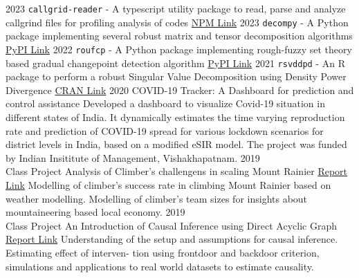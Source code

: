 \documentclass[9pt]{developercv} %
\begin{document}
\begin{entrylist}
    \vspace{-10pt}
    \entry
    {2023}
    {\texttt{callgrid-reader} - A typescript utility package to read, parse and analyze callgrind files for profiling analysis of codes}
    {\href{https://www.npmjs.com/package/callgrind-reader}{NPM Link}}
    {}
    \vspace{-10pt}
    \entry
    {2023}
    {\texttt{decompy} - A Python package implementing several robust matrix and tensor decomposition algorithms}
    {\href{https://pypi.org/project/decompy/}{PyPI Link}}
    {}
    \vspace{-10pt}
    \entry
    {2022}
    {\texttt{roufcp} - A Python package implementing rough-fuzzy set theory based gradual changepoint detection algorithm}
    {\href{https://pypi.org/project/roufcp/}{PyPI Link}}
    {}
    \vspace{-10pt}
    \entry
    {2021}
    {\texttt{rsvddpd} - An R package to perform a robust Singular Value Decomposition using Density Power Divergence}
    {\href{https://cran.r-project.org/web/packages/rsvddpd/index.html}{CRAN Link}}
    {}
    \entry
    {2020}
    {COVID-19 Tracker: A Dashboard for prediction and control assistance}
    {}
    {Developed a dashboard to visualize Covid-19 situation in different states of India. It dynamically estimates the time varying reproduction rate and prediction of COVID-19 spread for various lockdown scenarios for district levels in India, based on a modified eSIR model. The project was funded by Indian Insititute of Management, Vishakhapatnam.}
    \entry
    {2019\\Class Project}
    {Analysis of Climber's challengens in scaling Mount Rainier}
    {\href{https://github.com/subroy13/mount-rainier-case-study}{Report Link} }
    {Modelling of climber's success rate in climbing Mount Rainier based on weather modelling. Modelling of climber's team sizes for insights about mountaineering based local economy.}
    \entry
    {2019\\Class Project}
    {An Introduction of Causal Inference using Direct Acyclic Graph}
    {\href{https://www.statwizard.in/aboutme/causal-dag/final-report.pdf}{Report Link} }
    {Understanding of the setup and assumptions for causal inference. Estimating effect of interven-
        tion using frontdoor and backdoor criterion, simulations and applications to real world datasets to estimate
        causality.}
\end{entrylist}
\end{document}
